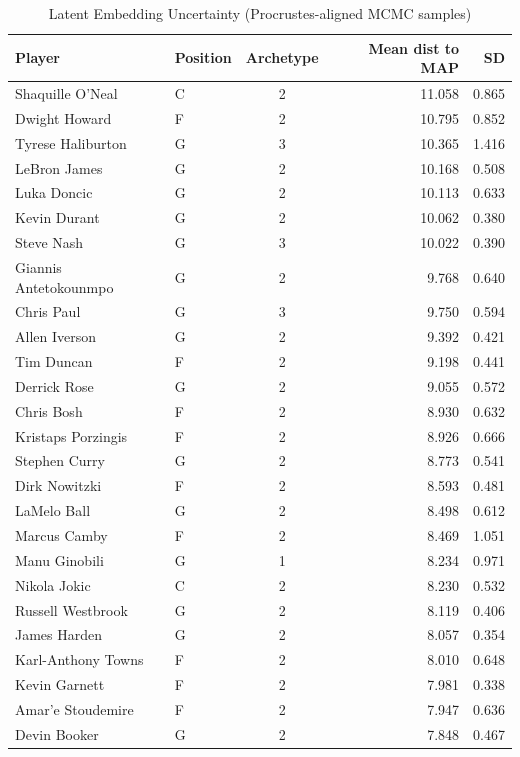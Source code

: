 \begin{table}[t]
\caption*{
{\fontsize{20}{25}\selectfont  Latent Embedding Uncertainty (Procrustes-aligned MCMC samples)\fontsize{12}{15}\selectfont }
} 
\fontsize{12.0pt}{14.0pt}\selectfont
\begin{tabular*}{\linewidth}{@{\extracolsep{\fill}}llcrr}
\toprule
Player & Position & Archetype & Mean dist to MAP & SD \\ 
\midrule\addlinespace[2.5pt]
Shaquille O'Neal & C & 2 & 11.058 & 0.865 \\ 
Dwight Howard & F & 2 & 10.795 & 0.852 \\ 
Tyrese Haliburton & G & 3 & 10.365 & 1.416 \\ 
LeBron James & G & 2 & 10.168 & 0.508 \\ 
Luka Doncic & G & 2 & 10.113 & 0.633 \\ 
Kevin Durant & G & 2 & 10.062 & 0.380 \\ 
Steve Nash & G & 3 & 10.022 & 0.390 \\ 
Giannis Antetokounmpo & G & 2 & 9.768 & 0.640 \\ 
Chris Paul & G & 3 & 9.750 & 0.594 \\ 
Allen Iverson & G & 2 & 9.392 & 0.421 \\ 
Tim Duncan & F & 2 & 9.198 & 0.441 \\ 
Derrick Rose & G & 2 & 9.055 & 0.572 \\ 
Chris Bosh & F & 2 & 8.930 & 0.632 \\ 
Kristaps Porzingis & F & 2 & 8.926 & 0.666 \\ 
Stephen Curry & G & 2 & 8.773 & 0.541 \\ 
Dirk Nowitzki & F & 2 & 8.593 & 0.481 \\ 
LaMelo Ball & G & 2 & 8.498 & 0.612 \\ 
Marcus Camby & F & 2 & 8.469 & 1.051 \\ 
Manu Ginobili & G & 1 & 8.234 & 0.971 \\ 
Nikola Jokic & C & 2 & 8.230 & 0.532 \\ 
Russell Westbrook & G & 2 & 8.119 & 0.406 \\ 
James Harden & G & 2 & 8.057 & 0.354 \\ 
Karl-Anthony Towns & F & 2 & 8.010 & 0.648 \\ 
Kevin Garnett & F & 2 & 7.981 & 0.338 \\ 
Amar'e Stoudemire & F & 2 & 7.947 & 0.636 \\ 
Devin Booker & G & 2 & 7.848 & 0.467 \\ 

\end{tabular*}
\end{table}
